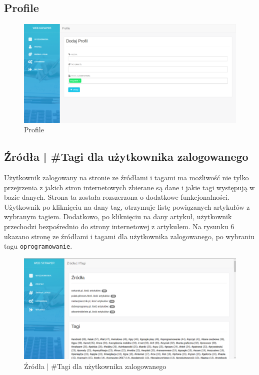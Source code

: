 \documentclass[12pt, titlepage]{article}
\begin{document}
	\newpage
	\subsection{Profile}
	\begin{figure}[H]
	\centering
	\includegraphics[scale=0.45]{obrazki/profile.png}
	\caption{Profile}
	\label{fig:db_schema}
	\end{figure}


	\newpage
	\subsection{Źródła | \#Tagi dla użytkownika zalogowanego}
	Użytkownik zalogowany na stronie ze źródłami i tagami ma możliwość nie tylko przejrzenia z jakich stron internetowych zbierane są dane i jakie tagi występują w bazie danych. Strona ta została rozszerzona o dodatkowe funkcjonalności. Użytkownik po kliknięciu na dany tag, otrzymuje listę powiązanych artykułów  z wybranym tagiem. Dodatkowo, po kliknięciu na dany artykuł, użytkownik przechodzi bezpośrednio do strony internetowej z artykułem. Na rysunku 6 ukazano stronę ze źródłami i tagami dla użytkownika zalogowanego, po wybraniu tagu \texttt{oprogramowanie}.
\begin{figure}[H]
	\centering
	\includegraphics[scale=0.45]{obrazki/zalogowanyZrodla.png}
	\caption{Źródła | \#Tagi dla użytkownika zalogowanego}
	\label{fig:db_schema}
\end{figure}
	
\end{document}
